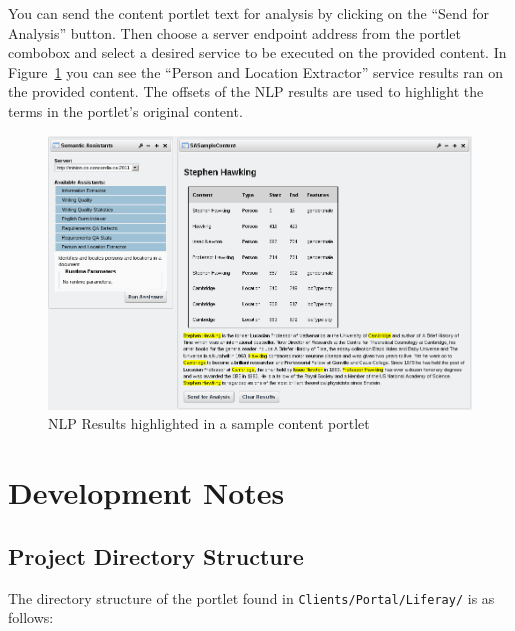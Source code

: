 You can send the content portlet text for analysis by clicking on the ``Send for Analysis'' button. Then choose a server endpoint address from the \sa portlet combobox and select a desired service to be executed on the provided content. In Figure~\ref{fig:liferay_results_portlet} you can see the ``Person and Location Extractor'' service results ran on the provided content. The offsets of the NLP results are used to highlight the terms in the portlet's original content.

\begin{figure}
\centering
\includegraphics[scale=0.6]{pictures/liferay_results_portlet.png}
\caption{NLP Results highlighted in a sample content portlet}
\label{fig:liferay_results_portlet}
\end{figure}

\section{Development Notes}
\subsection{Project Directory Structure}
The directory structure of the \sa portlet found in \texttt{Clients/Portal/Liferay/} is as follows:

